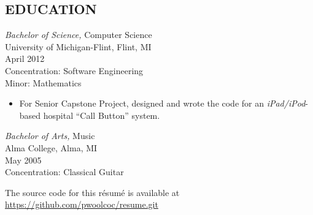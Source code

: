 \documentclass[line,margin]{res}
\begin{document}
\begin{resume}
\section{EDUCATION} 
                {\sl Bachelor of Science,} Computer Science \\
                University of Michigan-Flint, Flint, MI \\
                April 2012 \\
                Concentration: Software Engineering \\
                Minor: Mathematics
                \begin{itemize}
                    \item For Senior Capstone Project, designed and wrote 
                            the code for an {\sl iPad/iPod}-based hospital
                            ``Call Button'' system.
                \end{itemize}

                {\sl Bachelor of Arts,} Music \\
                Alma College, Alma, MI \\
                May 2005 \\
                Concentration: Classical Guitar

\end{resume}

The source code for this r\'{e}sum\'{e} is available at \href{https://github.com/pwoolcoc/resume.git}{https://github.com/pwoolcoc/resume.git}

\pagestyle{fancy}
\end{document}

